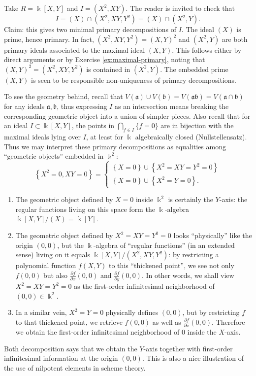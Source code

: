 \begin{example}
	Take $R=\Bbbk[X,Y]$ and $I = (X^2, XY)$. The reader is invited to check that
	\[ I = (X) \cap (X^2, XY, Y^2) = (X) \cap (X^2, Y). \]
	Claim: this gives two minimal primary decompositions of $I$. The ideal $(X)$ is prime, hence primary. In fact, $(X^2, XY, Y^2) = (X,Y)^2$ and $(X^2, Y)$ are both primary ideals associated to the maximal ideal $(X, Y)$. This follows either by direct arguments or by Exercise \ref{ex:maximal-primary}, noting that $(X,Y)^2 = (X^2, XY, Y^2)$ is contained in $(X^2, Y)$. The embedded prime $(X,Y)$ is seen to be responsible non-uniqueness of primary decompositions.
	
	To see the geometry behind, recall that $V(\mathfrak{a}) \cup V(\mathfrak{b}) = V(\mathfrak{a}\mathfrak{b}) = V(\mathfrak{a} \cap \mathfrak{b})$ for any ideals $\mathfrak{a}, \mathfrak{b}$, thus expressing $I$ as an intersection means breaking the corresponding geometric object into a union of simpler pieces. Also recall that for an ideal $I \subset \Bbbk[X,Y]$, the points in $\bigcap_{f \in I} \{f=0\}$ are in bijection with the maximal ideals lying over $I$, at least for $\Bbbk$ algebraically closed (Nullstellensatz). Thus we may interpret these primary decompositions as equalities among ``geometric objects'' embedded in $\Bbbk^2$:
	\[ \left\{ X^2=0, XY=0 \right\} = \begin{cases} \left\{ X = 0 \right\} \cup \left\{X^2=XY=Y^2=0 \right\} \\ \left\{ X = 0 \right\} \cup \left\{ X^2=Y=0 \right\}. \end{cases} \]
	\begin{enumerate}
		\item The geometric object defined by $X=0$ inside $\Bbbk^2$ is certainly the $Y$-axis: the regular functions living on this space form the $\Bbbk$-algebra $\Bbbk[X,Y]/(X) = \Bbbk[Y]$.
		\item The geometric object defined by $X^2=XY=Y^2=0$ looks ``physically'' like the origin $(0,0)$, but the $\Bbbk$-algebra of ``regular functions'' (in an extended sense) living on it equals $\Bbbk[X,Y]/(X^2,XY,Y^2)$: by restricting a polynomial function $f(X,Y)$ to this ``thickened point'', we see not only $f(0,0)$ but also $\frac{\partial f}{\partial x}(0,0)$ and $\frac{\partial f}{\partial y}(0,0)$. In other words, we shall view $X^2=XY=Y^2=0$ as the first-order infinitesimal neighborhood of $(0,0) \in \Bbbk^2$.
		\item In a similar vein, $X^2=Y=0$ physically defines $(0,0)$, but by restricting $f$ to that thickened point, we retrieve $f(0,0)$ as well as $\frac{\partial f}{\partial x}(0,0)$. Therefore we obtain the first-order infinitesimal neighborhood of $0$ inside the $X$-axis.
	\end{enumerate}

	Both decomposition says that we obtain the $Y$-axis together with first-order infinitesimal information at the origin $(0,0)$. This is also a nice illustration of the use of nilpotent elements in scheme theory.
\end{example}

